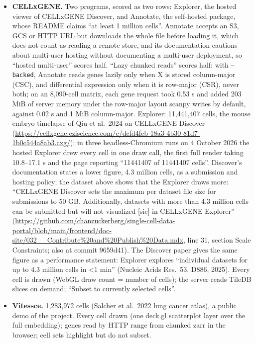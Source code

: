 \documentclass[11pt]{article}
\begin{document}
\begin{itemize}[nosep]
\item \textbf{CELLxGENE.} Two programs, scored as two rows: Explorer, the hosted viewer of CELLxGENE Discover, and Annotate, the self-hosted package, whose README claims ``at least 1 million cells''. Annotate accepts an S3, GCS or HTTP URL but downloads the whole file before loading it, which does not count as reading a remote store, and its documentation cautions about multi-user hosting without documenting a multi-user deployment, so ``hosted multi-user'' scores half. ``Lazy chunked reads'' scores half: with \texttt{--backed}, Annotate reads genes lazily only when X is stored column-major (CSC), and differential expression only when it is row-major (CSR), never both; on an 8,090-cell matrix, each gene request took 0.53 s and added 203 MiB of server memory under the row-major layout scanpy writes by default, against 0.02 s and 1 MiB column-major. Explorer: 11,441,407 cells, the mouse embryo timelapse of Qiu et al.\ 2024 on CELLxGENE Discover (\url{https://cellxgene.cziscience.com/e/dcfd4feb-18a3-4b30-81d7-1b0c544a8ab3.cxg/}); in three headless-Chromium runs on 4 October 2026 the hosted Explorer drew every cell in one draw call, the first full render taking 10.8--17.1 s and the page reporting ``11441407 of 11441407 cells''. Discover's documentation states a lower figure, 4.3 million cells, as a submission and hosting policy; the dataset above shows that the Explorer draws more: ``CELLxGENE Discover sets the maximum per dataset file size for submissions to 50 GB. Additionally, datasets with more than 4.3 million cells can be submitted but will not visualized [sic] in CELLxGENE Explorer'' (\url{https://github.com/chanzuckerberg/single-cell-data-portal/blob/main/frontend/doc-site/032__Contribute\%20and\%20Publish\%20Data.mdx}, line 31, section Scale Constraints; also at commit 9659d41). The Discover paper gives the same figure as a performance statement: Explorer explores ``individual datasets for up to 4.3 million cells in <1 min'' (Nucleic Acids Res.\ 53, D886, 2025).  Every cell is drawn (WebGL draw count = number of cells); the server reads TileDB slices on demand; ``Subset to currently selected cells''.
\item \textbf{Vitessce.} 1,283,972 cells (Salcher et al.\ 2022 lung cancer atlas), a public demo of the project. Every cell drawn (one deck.gl scatterplot layer over the full embedding); genes read by HTTP range from chunked zarr in the browser; cell sets highlight but do not subset.

\end{itemize}
\end{document}
